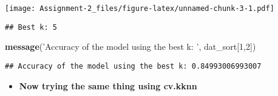\documentclass[
]{article}
\newenvironment{Shaded}{\begin{snugshade}}{\end{snugshade}}
\newcommand{\CommentTok}[1]{\textcolor[rgb]{0.56,0.35,0.01}{\textit{#1}}}
\newcommand{\DecValTok}[1]{\textcolor[rgb]{0.00,0.00,0.81}{#1}}
\newcommand{\KeywordTok}[1]{\textcolor[rgb]{0.13,0.29,0.53}{\textbf{#1}}}
\newcommand{\NormalTok}[1]{#1}
\newcommand{\OperatorTok}[1]{\textcolor[rgb]{0.81,0.36,0.00}{\textbf{#1}}}
\newcommand{\StringTok}[1]{\textcolor[rgb]{0.31,0.60,0.02}{#1}}
\providecommand{\tightlist}{%
  \setlength{\itemsep}{0pt}\setlength{\parskip}{0pt}}
\begin{document}
\texttt{[image: Assignment-2\_files/figure-latex/unnamed-chunk-3-1.pdf]}

\begin{Shaded}
\end{Shaded}

\begin{verbatim}
## Best k: 5
\end{verbatim}

\begin{Shaded}
\begin{Highlighting}[]
\KeywordTok{message}\NormalTok{(}\StringTok{'Accuracy of the model using the best k: '}\NormalTok{, dat_sort[}\DecValTok{1}\NormalTok{,}\DecValTok{2}\NormalTok{])}
\end{Highlighting}
\end{Shaded}

\begin{verbatim}
## Accuracy of the model using the best k: 0.84993006993007
\end{verbatim}

\begin{itemize}
\tightlist
\item
  \textbf{Now trying the same thing using cv.kknn}
\end{itemize}
\end{document}
